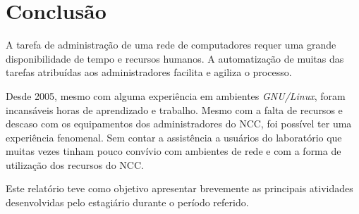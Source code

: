 \documentclass[a4paper,11pt]{article}
\begin{document}
\section{Conclusão}

A tarefa de administração de uma rede de computadores requer uma grande 
disponibilidade de tempo e recursos humanos.
A automatização de muitas das tarefas atribuídas aos administradores
facilita e agiliza o processo.

Desde 2005, mesmo com alguma experiência em ambientes
\textit{GNU/Linux}, foram incansáveis horas de aprendizado e trabalho.
Mesmo com a falta de recursos e descaso com os equipamentos dos
administradores do NCC, foi possível ter uma experiência fenomenal.
Sem contar a assistência a usuários do laboratório que muitas vezes
tinham pouco convívio com ambientes de rede e com a forma de
utilização dos recursos do NCC.

Este relatório teve como objetivo apresentar brevemente as principais
atividades desenvolvidas pelo estagiário durante o período referido.



\end{document}
